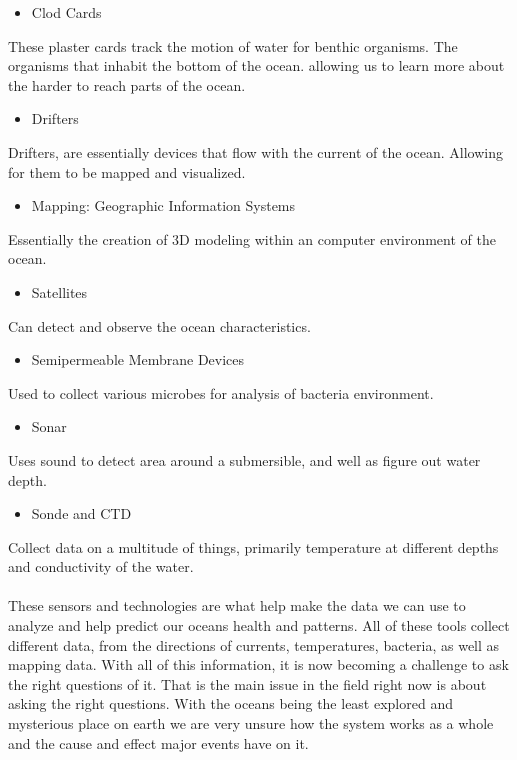 \documentclass[sigconf]{acmart}
\begin{document}
\begin{itemize}
\item Clod Cards
\end{itemize}
These plaster cards track the motion of water for benthic organisms.  The organisms that inhabit the bottom of the ocean.  allowing us to learn more about the harder to reach parts of the ocean.

\begin{itemize}
\item Drifters
\end{itemize}
Drifters, are essentially devices that flow with the current of the ocean.  Allowing for them to be mapped and visualized.

\begin{itemize}
\item Mapping: Geographic Information Systems
\end{itemize}
Essentially the creation of 3D modeling within an computer environment of the ocean.

\begin{itemize}
\item Satellites
\end{itemize}
Can detect and observe the ocean characteristics.

\begin{itemize}
\item Semipermeable Membrane Devices
\end{itemize}
Used to collect various microbes for analysis of bacteria environment.

\begin{itemize}
\item Sonar
\end{itemize}
Uses sound to detect area around a submersible, and well as figure out water depth.

\begin{itemize}
\item Sonde and CTD
\end{itemize}
Collect data on a multitude of things, primarily temperature at different depths and conductivity of the water.

\paragraph{}
These sensors and technologies are what help make the data we can use to analyze and help predict our oceans health and patterns.  All of these tools collect different data, from the directions of currents, temperatures, bacteria, as well as mapping data.  With all of this information, it is now becoming a challenge to ask the right questions of it.  That is the main issue in the field right now is about asking the right questions.  With the oceans being the least explored and mysterious place on earth we are very unsure how the system works as a whole and the cause and effect major events have on it.
\end{document}
